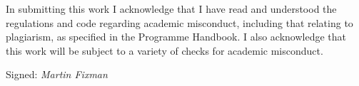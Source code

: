 \documentclass[a4paper,11pt]{article}
\begin{document}
In submitting this work I acknowledge that I have read and understood the regulations and code regarding academic misconduct, including that relating to plagiarism, as specified in the Programme Handbook.
I also acknowledge that this work will be subject to a variety of checks for academic misconduct.

Signed: \textsl{Martin Fixman}

\clearpage{}


\clearpage{}
\tableofcontents{}

\clearpage{}


\clearpage{}


\clearpage{}


\clearpage{}


\clearpage{}


\clearpage{}


\clearpage{}
\begin{small}
	
\end{small}

\clearpage{}

\appendixpage{}
\appendix{}



\clearpage{}




\end{document}
